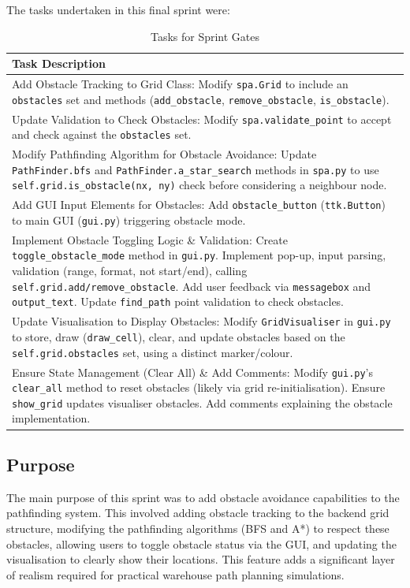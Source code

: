 The tasks undertaken in this final sprint were:
\begin{table}[htbp]
	\centering
	\begin{tabularx}{\textwidth}{|X|} %
		\hline
		\textbf{Task Description} \\ %
		\hline
		Add Obstacle Tracking to Grid Class: Modify \verb|spa.Grid| to include an \verb|obstacles| set and methods (\verb|add_obstacle|, \verb|remove_obstacle|, \verb|is_obstacle|). \\
		\hline
		Update Validation to Check Obstacles: Modify \verb|spa.validate_point| to accept and check against the \verb|obstacles| set.  \\
		\hline
		Modify Pathfinding Algorithm for Obstacle Avoidance: Update \verb|PathFinder.bfs| and \verb|PathFinder.a_star_search| methods in \verb|spa.py| to use \verb|self.grid.is_obstacle(nx, ny)| check before considering a neighbour node. \\
		\hline
		Add GUI Input Elements for Obstacles: Add \verb|obstacle_button| (\verb|ttk.Button|) to main GUI (\verb|gui.py|) triggering obstacle mode. \\
		\hline
		Implement Obstacle Toggling Logic \& Validation: Create \verb|toggle_obstacle_mode| method in \verb|gui.py|. Implement pop-up, input parsing, validation (range, format, not start/end), calling \verb|self.grid.add/remove_obstacle|. Add user feedback via \verb|messagebox| and \verb|output_text|. Update \verb|find_path| point validation to check obstacles. \\
		\hline
		Update Visualisation to Display Obstacles: Modify \verb|GridVisualiser| in \verb|gui.py| to store, draw (\verb|draw_cell|), clear, and update obstacles based on the \verb|self.grid.obstacles| set, using a distinct marker/colour. \\
		\hline
		Ensure State Management (Clear All) \& Add Comments: Modify \verb|gui.py|'s \verb|clear_all| method to reset obstacles (likely via grid re-initialisation). Ensure \verb|show_grid| updates visualiser obstacles. Add comments explaining the obstacle implementation. \\
		\hline
	\end{tabularx}
	\caption{Tasks for Sprint Gates}
\end{table}

\subsection{Purpose}
The main purpose of this sprint was to add obstacle avoidance capabilities to the pathfinding system. This involved adding obstacle tracking to the backend grid structure, modifying the pathfinding algorithms (BFS and A*) to respect these obstacles, allowing users to toggle obstacle status via the GUI, and updating the visualisation to clearly show their locations. This feature adds a significant layer of realism required for practical warehouse path planning simulations.

